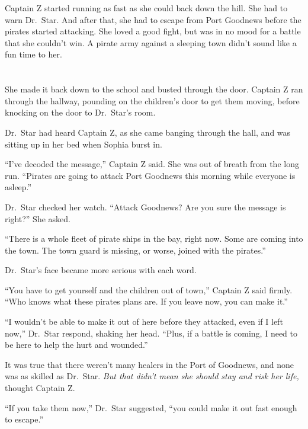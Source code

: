 \documentclass[12pt]{extbook}
\begin{document}
  Captain Z started running as fast as she could back down the hill. She
  had to warn Dr.~Star. And after that, she had to escape from Port
  Goodnews before the pirates started attacking. She loved a good fight,
  but was in no mood for a battle that she couldn't win. A pirate army
  against a sleeping town didn't sound like a fun time to her.
  
  \section{}\label{section-32}
  
  She made it back down to the school and busted through the door. Captain
  Z ran through the hallway, pounding on the children's door to get them
  moving, before knocking on the door to Dr.~Star's room.
  
  Dr.~Star had heard Captain Z, as she came banging through the hall, and
  was sitting up in her bed when Sophia burst in.
  
  \enquote{I've decoded the message,} Captain Z said. She was out of
  breath from the long run. \enquote{Pirates are going to attack Port
  Goodnews this morning while everyone is asleep.}
  
  Dr.~Star checked her watch. \enquote{Attack Goodnews? Are you sure the
  message is right?} She asked.
  
  \enquote{There is a whole fleet of pirate ships in the bay, right now.
  Some are coming into the town. The town guard is missing, or worse,
  joined with the pirates.}
  
  Dr.~Star's face became more serious with each word.
  
  \enquote{You have to get yourself and the children out of town,} Captain
  Z said firmly. \enquote{Who knows what these pirates plans are. If you
  leave now, you can make it.}
  
  \enquote{I wouldn't be able to make it out of here before they attacked,
  even if I left now,} Dr.~Star respond, shaking her head. \enquote{Plus,
  if a battle is coming, I need to be here to help the hurt and wounded.}
  
  It was true that there weren't many healers in the Port of Goodnews, and
  none was as skilled as Dr.~Star. \emph{But that didn't mean she should
  stay and risk her life,} thought Captain Z.
  
  \enquote{If you take them now,} Dr.~Star suggested, \enquote{you could
  make it out fast enough to escape.}
  
\end{document}
